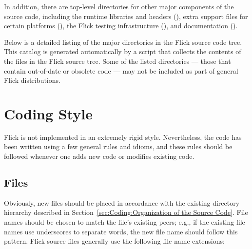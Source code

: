 In addition, there are top-level directories for other major components of the
source code, including the runtime libraries and headers (),
extra support files for certain platforms (), the Flick
testing infrastructure (), and documentation ().

Below is a detailed listing of the major directories in the Flick source code
tree.  This catalog is generated automatically by a script that collects the
contents of the  files in the Flick source tree.  Some
of the listed directories --- those that contain out-of-date or obsolete code
--- may not be included as part of general Flick distributions.

\begin{filenamelist}

\end{filenamelist}



\section{Coding Style}
\label{sec:Coding Style}

Flick is not implemented in an extremely rigid style.  Nevertheless, the code
has been written using a few general rules and idioms, and these rules should
be followed whenever one adds new code or modifies existing code.



\subsection{Files}
\label{subsec:Coding:Files}

Obviously, new files should be placed in accordance with the existing directory
hierarchy described in Section~\ref{sec:Coding:Organization of the Source
Code}.  File names should be chosen to match the file's existing peers; e.g.,
if the existing file names use underscores to separate words, the new file name
should follow this pattern.
%
Flick source files generally use the following file name extensions:

